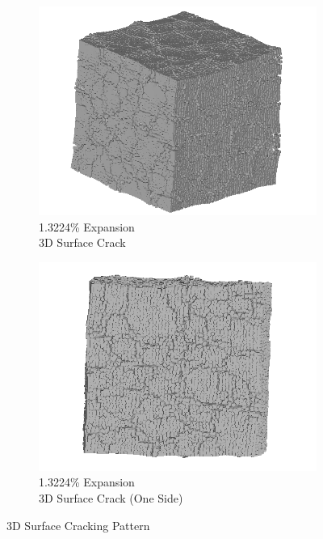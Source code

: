 \begin{figure}[ht!]
    \begin{subfigure}{.5\textwidth}
      \centering
      \includegraphics[width=0.5\linewidth]{Files/exp_3D/ASR/A30P75_5_3d.png}
      \caption{1.3224\% Expansion\\3D Surface Crack}
    \end{subfigure}%
    \begin{subfigure}{.5\textwidth}
      \centering
      \includegraphics[width=0.5\linewidth]{Files/exp_3D/ASR/A30P75_5_3ds.png}
      \caption{1.3224\% Expansion\\3D Surface Crack (One Side)}
    \end{subfigure}%

\caption{3D Surface Cracking Pattern}
\label{fig:A30_3Dcrack}
\end{figure}
